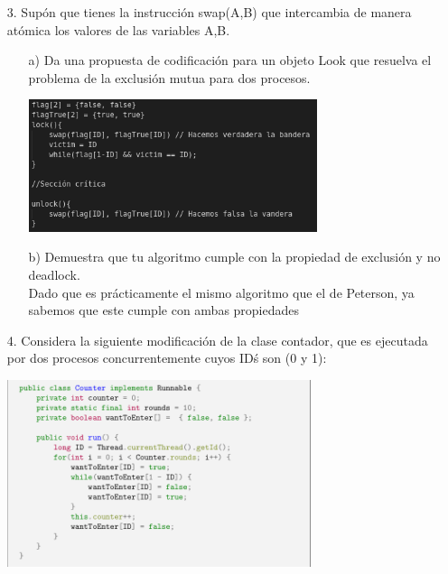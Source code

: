\documentclass[12pt, letterpaper]{article}
\begin{document}
\begin{itemize}
\begin{itemize}
\end{itemize}


\item[3. ]Sup\'on que tienes la instrucci\'on swap(A,B) que intercambia de manera at\'omica los valores de las variables A,B.

\begin{itemize}
\item[a) ]Da una propuesta de codificaci\'on para un objeto Look que resuelva el problema de la exclusi\'on mutua para dos procesos.\\
\begin{center}
\includegraphics[width=0.7\textwidth]{lock.png}\\
\end{center}

\item[b) ]Demuestra que tu algoritmo cumple con la propiedad de exclusi\'on y no deadlock.\\
Dado que es prácticamente el mismo algoritmo que el de Peterson, ya sabemos que este cumple con ambas propiedades
\end{itemize}
\item[4. ] Considera la siguiente modificaci\'on de la clase contador, que es ejecutada por dos procesos concurrentemente cuyos ID\' s son (0 y 1):
\begin{center}
\includegraphics[width=0.7\textwidth]{CounterCode.png}\\
\end{center}


\end{itemize}
\end{document}
